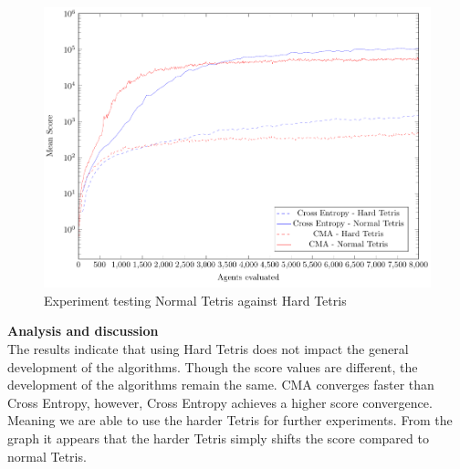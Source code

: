\begin{figure}[H]
\centering
\includegraphics[scale=1]{data/complexity/mean/PlotFile.pdf}
\caption{Experiment testing Normal Tetris against Hard Tetris}
\end{figure}

\textbf{Analysis and discussion}\\
The results indicate that using Hard Tetris does not impact the general development of the algorithms. Though the score values are different, the development of the algorithms remain the same. CMA converges faster than Cross Entropy, however, Cross Entropy achieves a higher score convergence.\\
Meaning we are able to use the harder Tetris for further experiments. From the graph it appears that the harder Tetris simply shifts the score compared to normal Tetris.\\


